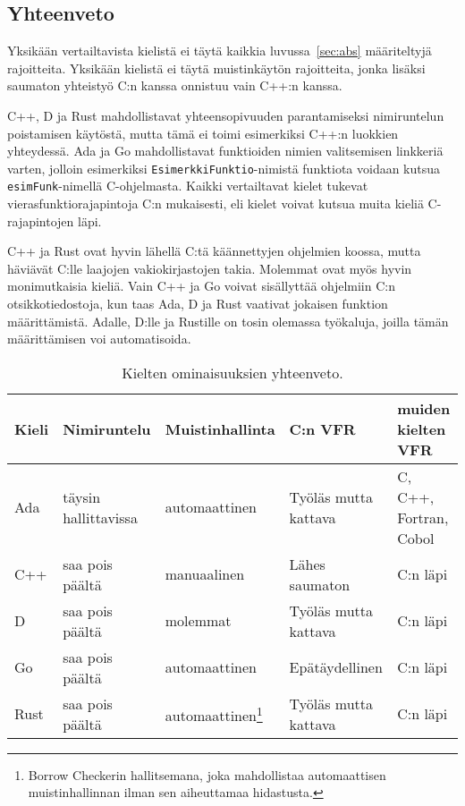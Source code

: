 \newpage

\subsection{Yhteenveto}

Yksikään vertailtavista kielistä ei täytä kaikkia luvussa~\ref{sec:abs}
määriteltyjä rajoitteita. Yksikään kielistä ei täytä muistinkäytön rajoitteita,
jonka lisäksi saumaton yhteistyö C:n kanssa onnistuu vain C++:n kanssa.

C++, D ja Rust mahdollistavat yhteensopivuuden parantamiseksi nimiruntelun
poistamisen käytöstä, mutta tämä ei toimi esimerkiksi C++:n luokkien
yhteydessä. Ada ja Go mahdollistavat funktioiden nimien valitsemisen linkkeriä
varten, jolloin esimerkiksi \texttt{EsimerkkiFunktio}-nimistä funktiota voidaan
kutsua \texttt{esimFunk}-nimellä C-ohjelmasta. Kaikki vertailtavat kielet
tukevat vierasfunktiorajapintoja C:n mukaisesti, eli kielet voivat kutsua muita
kieliä C-rajapintojen läpi.

C++ ja Rust ovat hyvin lähellä C:tä käännettyjen ohjelmien koossa, mutta
häviävät C:lle laajojen vakiokirjastojen takia. Molemmat ovat myös hyvin
monimutkaisia kieliä. Vain C++ ja Go voivat sisällyttää ohjelmiin C:n
otsikkotiedostoja, kun taas Ada, D ja Rust vaativat jokaisen funktion
määrittämistä. Adalle, D:lle ja Rustille on tosin olemassa työkaluja, joilla
tämän määrittämisen voi automatisoida.

\begin{table}[ht!]
    \begin{adjustbox}{center}
    \begin{tabular}{@{}lllll@{}} \toprule
        Kieli & Nimiruntelu   & Muistinhallinta                                     & C:n VFR               & muiden kielten VFR \\ \midrule
        Ada   & täysin hallittavissa & automaattinen                                       & Työläs mutta kattava  & C, C++, Fortran, Cobol \\
        C++   & saa pois päältä      & manuaalinen                                         & Lähes saumaton        & C:n läpi \\
        D     & saa pois päältä      & molemmat                                            & Työläs mutta kattava  & C:n läpi \\
        Go    & saa pois päältä      & automaattinen                                       & Epätäydellinen        & C:n läpi \\
        Rust  & saa pois päältä & automaattinen\footnote{Borrow Checkerin hallitsemana, joka mahdollistaa automaattisen muistinhallinnan ilman sen aiheuttamaa hidastusta.} & Työläs mutta kattava  & C:n läpi \\ \bottomrule
    \end{tabular}
    \end{adjustbox}
    \caption{
        Kielten ominaisuuksien yhteenveto.
    }
    \label{table:properties}
\end{table}

